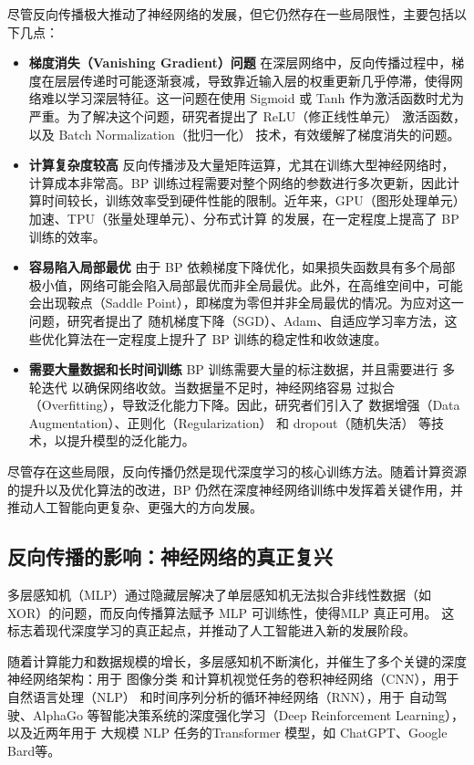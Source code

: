 尽管反向传播极大推动了神经网络的发展，但它仍然存在一些局限性，主要包括以下几点：
\begin{itemize}
\item {\bf 梯度消失（Vanishing Gradient）问题 } 在深层网络中，反向传播过程中，梯度在层层传递时可能逐渐衰减，导致靠近输入层的权重更新几乎停滞，使得网络难以学习深层特征。这一问题在使用 Sigmoid 或 Tanh 作为激活函数时尤为严重。为了解决这个问题，研究者提出了 ReLU（修正线性单元） 激活函数，以及 Batch Normalization（批归一化） 技术，有效缓解了梯度消失的问题。

\item {\bf  计算复杂度较高}
反向传播涉及大量矩阵运算，尤其在训练大型神经网络时，计算成本非常高。BP 训练过程需要对整个网络的参数进行多次更新，因此计算时间较长，训练效率受到硬件性能的限制。近年来，GPU（图形处理单元）加速、TPU（张量处理单元）、分布式计算 的发展，在一定程度上提高了 BP 训练的效率。

\item {\bf 容易陷入局部最优}
由于 BP 依赖梯度下降优化，如果损失函数具有多个局部极小值，网络可能会陷入局部最优而非全局最优。此外，在高维空间中，可能会出现鞍点（Saddle Point），即梯度为零但并非全局最优的情况。为应对这一问题，研究者提出了 随机梯度下降（SGD）、Adam、自适应学习率方法，这些优化算法在一定程度上提升了 BP 训练的稳定性和收敛速度。

\item {\bf 需要大量数据和长时间训练}
BP 训练需要大量的标注数据，并且需要进行 多轮迭代 以确保网络收敛。当数据量不足时，神经网络容易 过拟合（Overfitting），导致泛化能力下降。因此，研究者们引入了 数据增强（Data Augmentation）、正则化（Regularization） 和 dropout（随机失活） 等技术，以提升模型的泛化能力。
\end{itemize}

尽管存在这些局限，反向传播仍然是现代深度学习的核心训练方法。随着计算资源的提升以及优化算法的改进，BP 仍然在深度神经网络训练中发挥着关键作用，并推动人工智能向更复杂、更强大的方向发展。

\subsection{反向传播的影响：神经网络的真正复兴}
多层感知机（MLP）通过隐藏层解决了单层感知机无法拟合非线性数据（如 XOR）的问题，而反向传播算法赋予 MLP 可训练性，使得MLP 真正可用。%
这标志着现代深度学习的真正起点，并推动了人工智能进入新的发展阶段。

随着计算能力和数据规模的增长，多层感知机不断演化，并催生了多个关键的深度神经网络架构：用于 图像分类 和计算机视觉任务的卷积神经网络（CNN），用于 自然语言处理（NLP） 和时间序列分析的循环神经网络（RNN），用于 自动驾驶、AlphaGo 等智能决策系统的深度强化学习（Deep Reinforcement Learning），以及近两年用于 大规模 NLP 任务的Transformer 模型，如 ChatGPT、Google Bard等。

